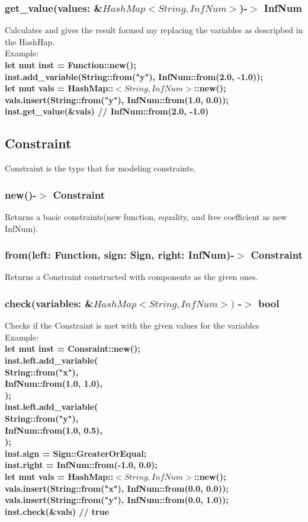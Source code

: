 \documentclass[]{article}
\begin{document}
				\subsubsection{get\_value(values: \&$HashMap<String, InfNum>$)-$>$ InfNum}
					Calculates and gives the result formed my replacing the variables as descripbed in the HashHap.\\Example:\\
					\large{\textbf{let mut inst = Function::new();\\
        inst.add\_variable(String::from("y"), InfNum::from(2.0, -1.0));\\
        let mut vals = HashMap::$<String, InfNum>$::new();\\
        vals.insert(String::from("y"), InfNum::from(1.0, 0.0));\\
        inst.get\_value(\&vals) // InfNum::from(2.0, -1.0)}}
			\subsection{Constraint}
				\Large{Constraint is the type that for modeling constraints.}
				\subsubsection{new()-$>$ Constraint}
					Returns a basic constraints(new function, equality, and free coefficient as new InfNum).
				\subsubsection{from(left: Function, sign: Sign, right: InfNum)-$>$ Constraint}
					Returns a Constraint constructed with components as the given ones.
				\subsubsection{check(variables: \&$HashMap<String, InfNum>)$ -$>$ bool}
					Checks if the Constraint is met with the given values for the variables\\Example:\\
					\large{\textbf{let mut inst = Consraint::new();\\
        inst.left.add\_variable(\\
            String::from("x"),\\
            InfNum::from(1.0, 1.0),\\
        );\\
        inst.left.add\_variable(\\
            String::from("y"),\\
            InfNum::from(1.0, 0.5),\\
        );\\
        inst.sign = Sign::GreaterOrEqual;\\
        inst.right = InfNum::from(-1.0, 0.0);\\
        let mut vals = HashMap::$<String, InfNum>$::new();\\
        vals.insert(String::from("x"), InfNum::from(0.0, 0.0));\\
        vals.insert(String::from("y"), InfNum::from(0.0, 1.0));\\
        inst.check(\&vals) // true}}
\end{document}
